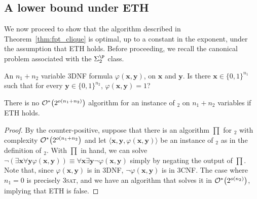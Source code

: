 \subsection{A lower bound under ETH}

We now proceed to show that the algorithm described in Theorem~\ref{thm:fpt_clique} is optimal, up to a constant in the exponent, under the assumption that ETH holds.
Before proceeding, we recall the canonical problem associated with the $\SiP{2}$ class.

{An $n_1 + n_2$ variable 3DNF formula $\varphi(\boldsymbol{x}, \boldsymbol{y})$, on $\boldsymbol{x}$ and $\boldsymbol{y}$.}
{Is there $\boldsymbol{x} \in \{0,1\}^{n_1}$ such that for every $\boldsymbol{y} \in \{0,1\}^{n_2}$, $\varphi(\boldsymbol{x}, \boldsymbol{y}) = 1$?}

\begin{lemma}
    There is no $\mathcal{O}^*\!\left(2^{o(n_1 + n_2)}\right)$ algorithm for an instance of $_2$ on $n_1 + n_2$ variables if ETH holds.
\end{lemma}

\begin{proof}
    By the counter-positive, suppose that there is an algorithm $\prod$ for $_2$ with complexity $\mathcal{O}^*\!\left(2^{o(n_1 + n_2}\right)$ and let $\langle\boldsymbol{x}, \boldsymbol{y}, \varphi(\boldsymbol{x},\boldsymbol{y})\rangle$ be an instance of $_2$ as in the definition of $_2$.
    With $\prod$ in hand, we can solve $\neg\left(\exists \boldsymbol{x} \forall \boldsymbol{y}\varphi(\boldsymbol{x}, \boldsymbol{y})\right) \equiv \forall \boldsymbol{x} \exists \boldsymbol{y} \neg\varphi(\boldsymbol{x}, \boldsymbol{y})$ simply by negating the output of $\prod$.
    Note that, since $\varphi(\boldsymbol{x}, \boldsymbol{y})$ is in 3DNF, $\neg\varphi(\boldsymbol{x}, \boldsymbol{y})$ is in 3CNF.
    The case where $n_1 = 0$ is precisely \textsc{3sat}, and we have an algorithm that solves it in $\mathcal{O}^*\!\left(2^{o(n_2)}\right)$, implying that ETH is false.
\end{proof}

